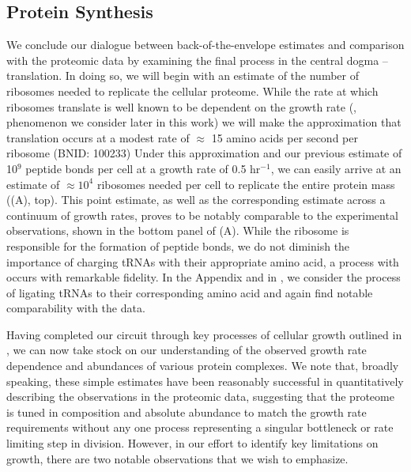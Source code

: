 \subsection{Protein Synthesis}
We conclude our dialogue between back-of-the-envelope estimates and
comparison with the proteomic data by examining the final process in the
central dogma -- translation. In doing so, we will begin with an estimate of
the number of ribosomes needed to replicate the cellular proteome. While the
rate at which ribosomes translate is well known to be dependent on the growth
rate (\cite{dai2018}, phenomenon we consider later in this work) we will make
the approximation that translation occurs at a modest rate of $\approx$ 15
amino acids per second per ribosome (BNID: 100233) Under this approximation
and our previous estimate of 10$^{9}$ peptide bonds per cell at a growth rate
of 0.5 hr$^{-1}$, we can easily arrive at an estimate of $\approx 10^4$
ribosomes needed per cell to replicate the entire protein mass
((A), top). This point estimate, as well as the
corresponding estimate across a continuum of growth rates, proves to be
notably comparable to the experimental observations, shown in the bottom
panel of (A). While the ribosome is responsible for
the formation of peptide bonds, we do not diminish the importance of charging
tRNAs with their appropriate amino acid, a process with occurs with
remarkable fidelity. In the Appendix and in
, we consider the process of ligating tRNAs
to their corresponding amino acid and again find notable comparability with
the data.

Having completed our circuit through key processes of cellular growth
outlined in , we can now take stock on our understanding of the
observed growth rate dependence and abundances of various protein complexes. We
note that, broadly speaking, these simple estimates have been reasonably successful in
quantitatively describing the observations in the proteomic data, suggesting
that the proteome is tuned in composition and absolute abundance to match the
growth rate requirements without any one process representing a singular 
bottleneck or rate limiting step in division. However, in our effort to identify
key limitations on growth, there are two notable observations that we
wish to emphasize.

